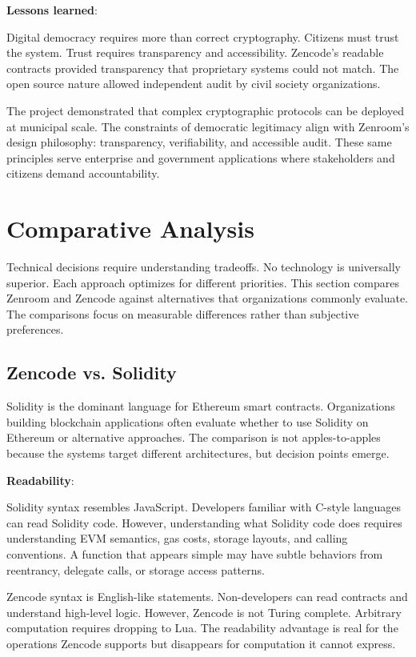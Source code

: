\textbf{Lessons learned}:

Digital democracy requires more than correct cryptography. Citizens
must trust the system. Trust requires transparency and
accessibility. Zencode's readable contracts provided transparency that
proprietary systems could not match. The open source nature allowed
independent audit by civil society organizations.

The project demonstrated that complex cryptographic protocols can be
deployed at municipal scale. The constraints of democratic legitimacy
align with Zenroom's design philosophy: transparency, verifiability,
and accessible audit. These same principles serve enterprise and
government applications where stakeholders and citizens demand
accountability.

\section{Comparative Analysis}

Technical decisions require understanding tradeoffs. No technology is
universally superior. Each approach optimizes for different
priorities. This section compares Zenroom and Zencode against
alternatives that organizations commonly evaluate. The comparisons
focus on measurable differences rather than subjective preferences.

\subsection{Zencode vs. Solidity}

Solidity is the dominant language for Ethereum smart
contracts. Organizations building blockchain applications often
evaluate whether to use Solidity on Ethereum or alternative
approaches. The comparison is not apples-to-apples because the systems
target different architectures, but decision points emerge.

\textbf{Readability}:

Solidity syntax resembles JavaScript. Developers familiar with C-style
languages can read Solidity code. However, understanding what Solidity
code does requires understanding EVM semantics, gas costs, storage
layouts, and calling conventions. A function that appears simple may
have subtle behaviors from reentrancy, delegate calls, or storage
access patterns.

Zencode syntax is English-like statements. Non-developers can read
contracts and understand high-level logic. However, Zencode is not
Turing complete. Arbitrary computation requires dropping to Lua. The
readability advantage is real for the operations Zencode supports but
disappears for computation it cannot express.

